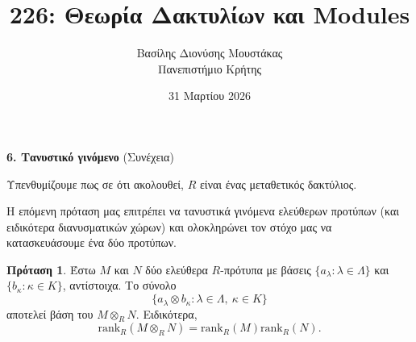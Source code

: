 \documentclass[12pt,a4paper,reqno]{amsart}
\title{226: Θεωρία Δακτυλίων και Modules}
\author[Β.~Δ. Μουστακας]{Βασίλης Διονύσης Μουστάκας \\ Πανεπιστήμιο Κρήτης}
\date{31 Μαρτίου 2026}
\theoremstyle{definition}
\newtheorem{proposition}[theorem]{Πρόταση}
\theoremstyle{remark}
\numberwithin{theorem}{section}
\numberwithin{exercise}{section}
\numberwithin{equation}{section}
\newcommand{\rmrank}{\mathrm{rank}}
\begin{document}
\begingroup
\def\uppercasenonmath#1{} %
\let\MakeUppercase\relax %
\maketitle
\endgroup

\setcounter{section}{6}
\setcounter{theorem}{6}
\setcounter{equation}{4}
\begin{center}
    \textbf{6. Τανυστικό γινόμενο
} (Συνέχεια)
\end{center}

Υπενθυμίζουμε πως σε ότι ακολουθεί, $R$ είναι ένας μεταθετικός δακτύλιος.

Η επόμενη πρόταση μας επιτρέπει να  τανυστικά γινόμενα ελεύθερων προτύπων (και ειδικότερα διανυσματικών χώρων) και ολοκληρώνει τον στόχο μας να κατασ\-κευάσουμε ένα  δύο προτύπων.

\begin{proposition}
    \label{prop:tensorProduct_free}
    Έστω $M$ και $N$ δύο ελεύθερα $R$-πρότυπα με βάσεις $\{a_\lambda : \lambda \in \Lambda\}$ και $\{b_\kappa : \kappa \in K\}$, αντίστοιχα. Το σύνολο 
    \[
    \{a_\lambda \otimes b_\kappa : \lambda \in \Lambda, \ \kappa \in K\}
    \]
    αποτελεί βάση του $M \otimes_R N$. Ειδικότερα,
    \[
    \rmrank_R(M\otimes_RN) = \rmrank_R(M)\rmrank_R(N).
    \]
\end{proposition}
\end{document}
